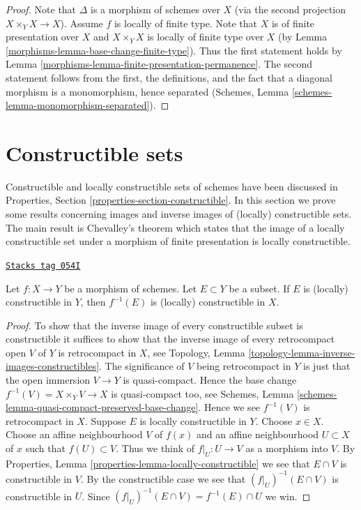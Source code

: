 \begin{proof}

Note that $\Delta$ is a morphism of schemes over $X$ (via the second
projection $X \times_Y X \to X$). Assume $f$ is locally of finite type.
Note that $X$ is of finite presentation over $X$ and $X \times_Y X$ is
locally of finite type over $X$ (by Lemma \ref{morphisms-lemma-base-change-finite-type}).
Thus the first statement holds by
Lemma \ref{morphisms-lemma-finite-presentation-permanence}.
The second statement follows from the first, the definitions, and
the fact that a diagonal morphism is a monomorphism, hence separated
(Schemes, Lemma \ref{schemes-lemma-monomorphism-separated}).
\end{proof}

\section{Constructible sets}
\label{morphisms-section-constructible}
Constructible and locally constructible sets of schemes have been discussed in
Properties, Section \ref{properties-section-constructible}.
In this section we prove some results concerning images and inverse images
of (locally) constructible sets. The main result is Chevalley's theorem
which states that the image of a locally constructible set under a morphism
of finite presentation is locally constructible.

\begin{lemma}
\label{morphisms-lemma-inverse-image-constructible}
\href{https://stacks.math.columbia.edu/tag/054I}{\texttt{Stacks tag 054I}}

Let $f : X \to Y$ be a morphism of schemes.
Let $E \subset Y$ be a subset.
If $E$ is (locally) constructible in $Y$, then $f^{-1}(E)$ is (locally)
constructible in $X$.
\end{lemma}

\begin{proof}
To show that the inverse image of every constructible subset is constructible
it suffices to show that the inverse image of every retrocompact open $V$
of $Y$ is retrocompact in $X$, see
Topology, Lemma \ref{topology-lemma-inverse-images-constructibles}.
The significance of $V$ being retrocompact
in $Y$ is just that the open immersion $V \to Y$ is quasi-compact.
Hence the base change $f^{-1}(V) = X \times_Y V \to X$ is quasi-compact
too, see
Schemes, Lemma \ref{schemes-lemma-quasi-compact-preserved-base-change}.
Hence we see $f^{-1}(V)$ is retrocompact in $X$.
Suppose $E$ is locally constructible in $Y$.
Choose $x \in X$. Choose an affine neighbourhood $V$ of $f(x)$ and
an affine neighbourhood $U \subset X$ of $x$ such that $f(U) \subset V$.
Thus we think of $f|_U : U \to V$ as a morphism into $V$. By
Properties, Lemma \ref{properties-lemma-locally-constructible}
we see that $E \cap V$ is constructible in $V$. By the constructible case
we see that $(f|_U)^{-1}(E \cap V)$ is constructible in $U$.
Since $(f|_U)^{-1}(E \cap V) = f^{-1}(E) \cap U$ we win.
\end{proof}

